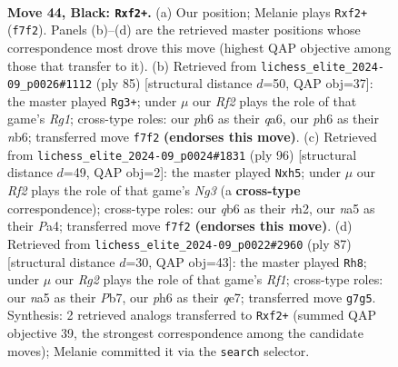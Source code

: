 \documentclass[11pt]{article}
\begin{document}
\clearpage

\begin{figure}[p]\centering
\begin{subfigure}{0.46\textwidth}\centering
\resizebox{\linewidth}{!}{%
\newchessgame
\chessboard[
  setfen={7k/5rrp/1Q5P/Np6/6P1/8/PP3P1K/3R4 b - - 0 44},
  showmover=false,
  pgfstyle=straightmove, color=movearrow, markmove={f7-f2}
]}
\caption{}
\end{subfigure}\hfill
\begin{subfigure}{0.46\textwidth}\centering
\resizebox{\linewidth}{!}{%
\newchessgame
\chessboard[
  setfen={1kr3r1/8/QN2Np2/7p/4p2P/K7/1PPn4/5R2 b - - 0 43},
  showmover=false,
  pgfstyle=straightmove, color=movearrow, markmove={g8-g3}
]}
\caption{}
\end{subfigure}
\\[4pt]
\begin{subfigure}{0.46\textwidth}\centering
\resizebox{\linewidth}{!}{%
\newchessgame
\chessboard[
  setfen={7k/p2RR3/2p2q2/2P4p/P5K1/6N1/7r/8 w - - 0 49},
  showmover=false,
  pgfstyle=straightmove, color=movearrow, markmove={g3-h5}
]}
\caption{}
\end{subfigure}\hfill
\begin{subfigure}{0.46\textwidth}\centering
\resizebox{\linewidth}{!}{%
\newchessgame
\chessboard[
  setfen={3r1r2/1p1PQ3/p2P2k1/P6p/8/8/5PK1/8 b - - 1 44},
  showmover=false,
  pgfstyle=straightmove, color=movearrow, markmove={f8-h8}
]}
\caption{}
\end{subfigure}
\caption{\textbf{Move 44, Black: \texttt{Rxf2+}.} (a) Our position; Melanie plays \texttt{Rxf2+} (\texttt{f7f2}). Panels (b)--(d) are the retrieved master positions whose correspondence most drove this move (highest QAP objective among those that transfer to it). (b) Retrieved from \texttt{lichess\_elite\_2024-09\_p0026\#1112} (ply 85) [structural distance $d$=50, QAP obj=37]: the master played \texttt{Rg3+}; under $\mu$ our \emph{Rf2} plays the role of that game's \emph{Rg1}; cross-type roles: our \emph{p}h6 as their \emph{q}a6, our \emph{p}h6 as their \emph{n}b6; transferred move \texttt{f7f2} \textbf{(endorses this move)}. (c) Retrieved from \texttt{lichess\_elite\_2024-09\_p0024\#1831} (ply 96) [structural distance $d$=49, QAP obj=2]: the master played \texttt{Nxh5}; under $\mu$ our \emph{Rf2} plays the role of that game's \emph{Ng3} (a \textbf{cross-type} correspondence); cross-type roles: our \emph{q}b6 as their \emph{r}h2, our \emph{n}a5 as their \emph{P}a4; transferred move \texttt{f7f2} \textbf{(endorses this move)}. (d) Retrieved from \texttt{lichess\_elite\_2024-09\_p0022\#2960} (ply 87) [structural distance $d$=30, QAP obj=43]: the master played \texttt{Rh8}; under $\mu$ our \emph{Rg2} plays the role of that game's \emph{Rf1}; cross-type roles: our \emph{n}a5 as their \emph{P}b7, our \emph{p}h6 as their \emph{q}e7; transferred move \texttt{g7g5}. Synthesis: 2 retrieved analogs transferred to \texttt{Rxf2+} (summed QAP objective 39, the strongest correspondence among the candidate moves); Melanie committed it via the \texttt{search} selector.}
\label{fig:thought-m87}
\end{figure}
\end{document}
